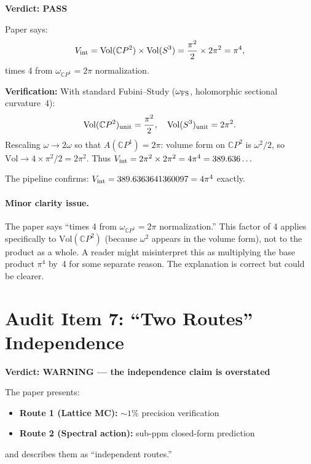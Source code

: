 \documentclass[11pt]{article}
\newcommand{\PASS}{\textcolor{pass}{\textbf{PASS}}}
\newcommand{\WARN}{\textcolor{warn}{\textbf{WARNING}}}
\begin{document}
\textbf{Verdict: \PASS}

\medskip
\noindent Paper says:
\[
V_{\rm int} = \mathrm{Vol}(\mathbb{C}P^2) \times \mathrm{Vol}(S^3)
= \frac{\pi^2}{2} \times 2\pi^2 = \pi^4,
\]
times 4 from $\omega_{\mathbb{C}P^1} = 2\pi$ normalization.

\textbf{Verification:}
With standard Fubini--Study ($\omega_{\rm FS}$, holomorphic sectional curvature~4):
\[
\mathrm{Vol}(\mathbb{C}P^2)_{\rm unit} = \frac{\pi^2}{2}, \quad
\mathrm{Vol}(S^3)_{\rm unit} = 2\pi^2.
\]
Rescaling $\omega \to 2\omega$ so that $A(\mathbb{C}P^1) = 2\pi$:
volume form on $\mathbb{C}P^2$ is $\omega^2/2$, so
$\mathrm{Vol} \to 4 \times \pi^2/2 = 2\pi^2$.
Thus $V_{\rm int} = 2\pi^2 \times 2\pi^2 = 4\pi^4 = 389.636\ldots$

The pipeline confirms: $V_{\rm int} = 389.6363641360097 = 4\pi^4$ exactly.

\paragraph{Minor clarity issue.}
The paper says ``times 4 from $\omega_{\mathbb{C}P^1} = 2\pi$ normalization.''
This factor of 4 applies specifically to $\mathrm{Vol}(\mathbb{C}P^2)$
(because $\omega^2$ appears in the volume form), not to the product as a whole.
A reader might misinterpret this as multiplying the base product $\pi^4$ by~4
for some separate reason. The explanation is correct but could be clearer.

\section{Audit Item 7: ``Two Routes'' Independence}

\textbf{Verdict: \WARN{} --- the independence claim is overstated}

\medskip
The paper presents:
\begin{itemize}
\item \textbf{Route 1 (Lattice MC):} $\sim 1\%$ precision verification
\item \textbf{Route 2 (Spectral action):} sub-ppm closed-form prediction
\end{itemize}
and describes them as ``independent routes.''
\end{document}
